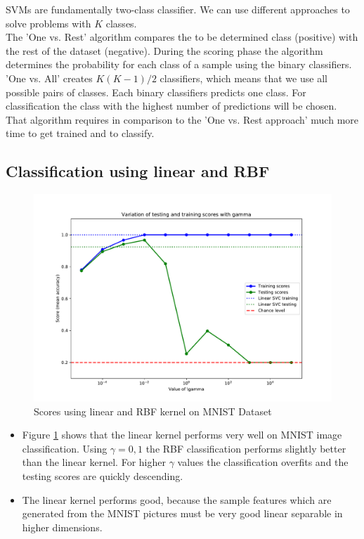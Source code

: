 \documentclass{article}
\begin{document}
SVMs are fundamentally two-class classifier. We can use different approaches to solve problems with $K$ classes. \\
The 'One vs. Rest' algorithm compares the to be determined class (positive) with the rest of the dataset (negative). During the scoring phase the algorithm determines the probability for each class of a sample using the binary classifiers.\\
'One vs. All' creates $K(K-1)/2$ classifiers, which means that we use all possible pairs of classes. Each binary classifiers predicts one class. For classification the class with the highest number of predictions will be chosen. That algorithm requires in comparison to the 'One vs. Rest approach' much more time to get trained and to classify.

\subsection{Classification using linear and RBF}

\begin{figure}[!ht]
	\centering
	\includegraphics[width=.8\textwidth]{./Figures/3a_score.pdf}
	\caption{Scores using linear and RBF kernel on MNIST Dataset}
	\label{multiclass_classification}
\end{figure}

\begin{itemize}

	\item Figure \ref{multiclass_classification} shows that the linear kernel performs very well on MNIST image classification. Using $\gamma = 0,1$ the RBF classification performs slightly better than the linear kernel. For higher $\gamma$ values the classification overfits and the testing scores are quickly descending.
	
	\item The linear kernel performs good, because the sample features which are generated from the MNIST pictures must be very good linear separable in higher dimensions. 

\end{itemize}
\end{document}
